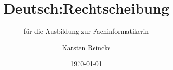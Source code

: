 \documentclass[]{beamer}
\title{Deutsch:Rechtscheibung}
\subtitle{für die Ausbildung zur Fachinformatikerin}
\institute[GS-LDK]{Gewerbliche Schulen Dillenburg}
\author{Karsten Reincke}
\date{\today}
\def\cfgGl{../../../cfg.gl/}
\begin{document}

\begin{frame}
  \titlepage

  
\end{frame}






\logo{}
\newpage



%
\end{document}
